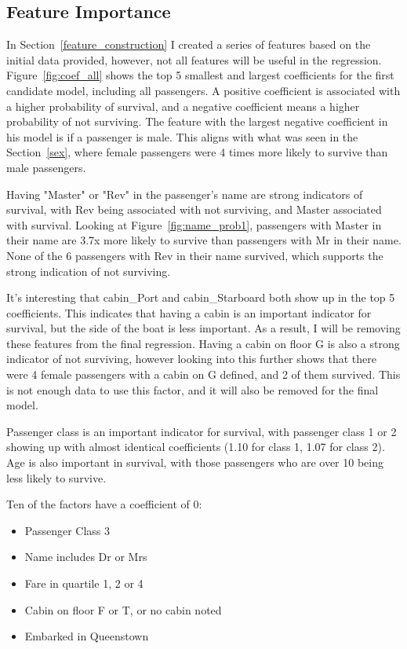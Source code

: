 \documentclass[12pt, letterpaper]{article}
\begin{document}
\subsection{Feature Importance}

In Section~\ref{feature_construction} I created a series of features based on the initial data provided, however, not all features will be useful in the regression. Figure~\ref{fig:coef_all} shows the top 5 smallest and largest coefficients for the first candidate model, including all passengers. A positive coefficient is associated with a higher probability of survival, and a negative coefficient means a higher probability of not surviving. The feature with the largest negative coefficient in his model is if a passenger is male. This aligns with what was seen in the Section~\ref{sex}, where female passengers were 4 times more likely to survive than male passengers.

Having "Master" or "Rev" in the passenger's name are strong indicators of survival, with Rev being associated with not surviving, and Master associated with survival. Looking at Figure~\ref{fig:name_prob1}, passengers with Master in their name are 3.7x more likely to survive than passengers with Mr in their name. None of the 6 passengers with Rev in their name survived, which supports the strong indication of not surviving.

It's interesting that cabin_Port and cabin_Starboard both show up in the top 5 coefficients. This indicates that having a cabin is an important indicator for survival, but the side of the boat is less important. As a result, I will be removing these features from the final regression. Having a cabin on floor G is also a strong indicator of not surviving, however looking into this further shows that there were 4 female passengers with a cabin on G defined, and 2 of them survived. This is not enough data to use this factor, and it will also be removed for the final model.

Passenger class is an important indicator for survival, with passenger class 1 or 2 showing up with almost identical coefficients (1.10 for class 1, 1.07 for class 2). Age is also important in survival, with those passengers who are over 10 being less likely to survive.

Ten of the factors have a coefficient of 0:
\begin{itemize}
    \item Passenger Class 3
    \item Name includes Dr or Mrs
    \item Fare in quartile 1, 2 or 4
    \item Cabin on floor F or T, or no cabin noted
    \item Embarked in Queenstown
\end{itemize}
\end{document}
